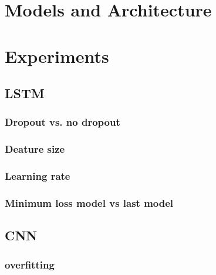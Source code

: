 \documentclass[a4paper]{article}
\begin{document}

\section{Models and Architecture}

\section{Experiments}

\subsection{LSTM}  %
\subsubsection{Dropout vs. no dropout} %

\subsubsection{Deature size} %
\subsubsection{Learning rate} %
\subsubsection{Minimum loss model vs last model} %

\subsection{CNN} %
\subsubsection{overfitting} %
\end{document}
